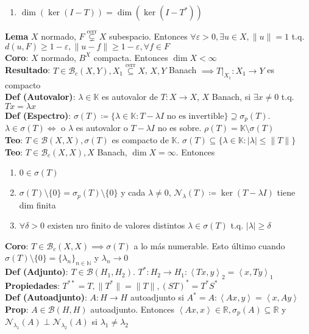 \documentclass[9pt, letterpaper]{extarticle}
\newcommand{\N}{\mathbb{N}}
\newcommand{\R}{\mathbb{R}}
\newcommand{\K}{\mathbb{K}}
\newcommand{\inn}[1]{\left\langle #1\right\rangle}
\begin{document}
\begin{multicols*}{2}
\begin{enumerate}
	\item $\operatorname{dim}(\operatorname{ker}(I-T))=\operatorname{dim}(\operatorname{ker}(I-T^*))$
\end{enumerate}
\textbf{Lema} $X$ normado, $F\overset{\text{cerr}}{\subsetneq} X$ subespacio. Entonces $\forall \varepsilon>0,\exists u\in X,\|u\|=1$ t.q. $d(u,F)\geq 1-\varepsilon, \|u-f\|\geq 1-\varepsilon,\forall f\in F$\\
\textbf{Coro}: $X$ normado, $B^X$ compacta. Entonces $\operatorname{dim}X<\infty$\\
\textbf{Resultado}: $T\in\mathcal{B}_c(X,Y), X_1\overset{\text{cerr}}{\subseteq}X$, $X,Y$ Banach $\implies T\big|_{X_1}:X_1\to Y$ es compacto\\
\textbf{Def (Autovalor)}: $\lambda\in\K$ es autovalor de $T:X\to X$, $X$ Banach, si $\exists x\neq 0$ t.q. $Tx=\lambda x$\\
\textbf{Def (Espectro)}: $\sigma(T)\coloneqq \{\lambda\in\K:T-\lambda I\text{ no es invertible}\}\supseteq \sigma_p(T)$. $\lambda\in \sigma(T)\iff$ o $\lambda$ es autovalor o $T-\lambda I$ no es sobre. $\rho(T)=\K\setminus \sigma(T)$\\
\textbf{Teo}: $T\in\mathcal{B}(X,X), \sigma(T)$ es compacto de $\K$. $\sigma(T)\subseteq \{\lambda\in\K:|\lambda|\leq \|T\|\}$\\
\textbf{Teo}: $T\in\mathcal{B}_c(X,X), X$ Banach, $\operatorname{dim} X=\infty$. Entonces \begin{enumerate}
	\item $0\in\sigma(T)$
	\item $\sigma(T)\setminus\{0\}=\sigma_p(T)\setminus\{0\}$ y cada $\lambda\neq 0$, $\mathcal{N}_\lambda(T)\coloneqq \operatorname{ker}(T-\lambda I)$ tiene dim finita 
	\item $\forall \delta>0$ existen nro finito de valores distintos $\lambda\in\sigma(T)$ t.q. $|\lambda|\geq \delta$
\end{enumerate}
\textbf{Coro}: $T\in\mathcal{B}_c(X,X)\implies \sigma(T)$ a lo más numerable. Esto último cuando $\sigma(T)\setminus\{0\}=\{\lambda_n\}_{n\in\N}$ y $\lambda_n\to 0$\\
\textbf{Def (Adjunto)}: $T\in\mathcal{B}(H_1,H_2)$. $T^*:H_2\to H_1:\inn{Tx,y}_2=\inn{x,Ty}_1$\\
\textbf{Propiedades}: $T^{**}=T, \|T^*\|=\|T\|, (ST)^*=T^*S^*$\\
\textbf{Def (Autoadjunto)}: $A:H\to H$ autoadjunto si $A^*=A: \inn{Ax,y}=\inn{x,Ay}$\\
\textbf{Prop}: $A\in\mathcal{B}(H,H)$ autoadjunto. Entonces $\inn{Ax,x}\in\R, \sigma_p(A)\subseteq \R$ y $\mathcal{N}_{\lambda_1}(A)\perp\mathcal{N}_{\lambda_2}(A)$ si $\lambda_1\neq\lambda_2$\\

\end{multicols*}
\end{document}
